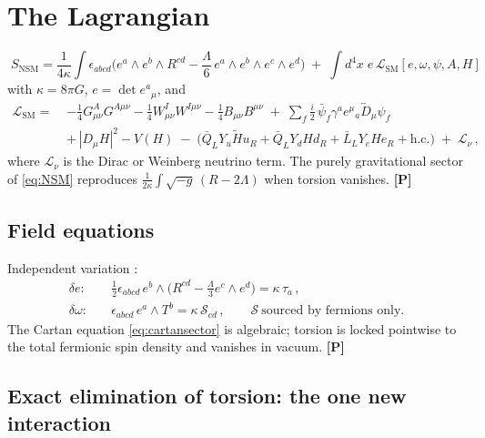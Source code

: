 \documentclass[11pt]{article}
\theoremstyle{definition}
\newcommand{\pP}{\textbf{[P]}}
\begin{document}
\section{The Lagrangian}

\begin{equation}
\boxed{\;
S_{\mathrm{NSM}}
=\frac{1}{4\kappa}\!\int\!\epsilon_{abcd}\Big(e^a\wedge e^b\wedge R^{cd}
-\frac{\Lambda}{6}\,e^a\wedge e^b\wedge e^c\wedge e^d\Big)
\;+\;\int d^4x\;e\,\mathcal{L}_{\mathrm{SM}}[e,\omega,\psi,A,H]\;}
\label{eq:NSM}
\end{equation}
with $\kappa=8\pi G$, $e=\det e^a{}_\mu$, and
\begin{align}
\mathcal{L}_{\mathrm{SM}}
=\;&-\tfrac{1}{4}G^A_{\mu\nu}G^{A\mu\nu}
   -\tfrac{1}{4}W^I_{\mu\nu}W^{I\mu\nu}
   -\tfrac{1}{4}B_{\mu\nu}B^{\mu\nu}
\;+\;\sum_f \tfrac{i}{2}\,\bar\psi_f\gamma^a e^\mu{}_a
      \overleftrightarrow{D}_\mu\psi_f
\nonumber\\[2pt]
&+\,|D_\mu H|^2 - V(H)
\;-\;\Big(\bar Q_L Y_u \tilde H u_R + \bar Q_L Y_d H d_R
      + \bar L_L Y_e H e_R + \mathrm{h.c.}\Big)
\;+\;\mathcal{L}_\nu\,,
\label{eq:LSM}
\end{align}
where $\mathcal{L}_\nu$ is the Dirac or Weinberg neutrino term. The purely
gravitational sector of \eqref{eq:NSM} reproduces
$\tfrac{1}{2\kappa}\!\int\!\sqrt{-g}\,(R-2\Lambda)$ when torsion vanishes.
\pP{}

\subsection{Field equations}

Independent variation \cite{Kibble1961,Sciama1964,HehlRMP1976}:
\begin{align}
\delta e:&\quad
\tfrac{1}{2}\epsilon_{abcd}\,e^b\wedge\!\Big(R^{cd}
-\tfrac{\Lambda}{3}e^c\wedge e^d\Big)=\kappa\,\tau_a\,,
\label{eq:einsteinsector}\\
\delta\omega:&\quad
\epsilon_{abcd}\,e^a\wedge T^b=\kappa\,\mathcal{S}_{cd}\,,
\qquad
\mathcal{S}\ \text{sourced by fermions only.}
\label{eq:cartansector}
\end{align}
The Cartan equation \eqref{eq:cartansector} is algebraic; torsion is
locked pointwise to the total fermionic spin density and vanishes in
vacuum. \pP{}

\subsection{Exact elimination of torsion: the one new interaction}
\end{document}
